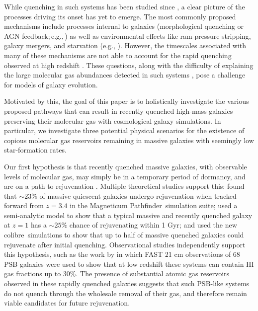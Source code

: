 \documentclass[twocolumn, linenumbers]{aastex631}
\newcommand{\magnet}[0]{{\sc Magneticum Pathfinder}}
\newcommand{\colibre}[0]{{\sc colibre}}
\begin{document}

While quenching in such systems has been studied since \citet{dressler}, a clear picture of the processes driving its onset has yet to emerge.  The most commonly proposed mechanisms include processes internal to galaxies (morphological quenching or AGN feedback;\,e.g.,\,\citealt{Martig09, Baron18, Calabro19}) as well as environmental effects like ram-pressure stripping, galaxy mergers, and starvation (e.g.,\! \citealt{blanton09,snyder, Lotz21, Spilker22, Donofrio25}).  However, the timescales associated with many of these mechanisms are not able to account for the rapid quenching observed at high redshift \citep{Yesuf14, french_2017, winds, french_2021, Bezanson_2022}. These questions, along with the difficulty of explaining the large molecular gas abundances detected in such systems \citep[e.g.,][]{YusefHo20, cenci25, setton2025}, pose a challenge for models of galaxy evolution.

Motivated by this, the goal of this paper is to holistically investigate the various proposed pathways that can result in recently quenched high-mass galaxies preserving their molecular gas with cosmological galaxy simulations.  In particular, we investigate three potential physical scenarios for the existence of copious molecular gas reservoirs remaining in massive galaxies with seemingly low star-formation rates.

Our first hypothesis is that recently quenched massive galaxies, with observable levels of molecular gas, may simply be in a temporary period of dormancy, and are on a path to rejuvenation \citep{remus2023,Kimmig25}.  Multiple theoretical studies support this: \cite{Lotz21} found that $\sim23\%$ of massive quiescent galaxies undergo rejuvenation when tracked forward from $z=3.4$ in the \magnet\ simulation suite; \cite{harrold2025} used a semi-analytic model to show that a typical massive and recently quenched galaxy at $z=1$ has a $\sim25\%$ chance of rejuvenating within 1 Gyr; and \cite{colibre} used the new \colibre\ simulations to show that up to half of massive quenched galaxies could rejuvenate after initial quenching.  Observational studies independently support this hypothesis, such as the work by \cite{ellison25} in which FAST 21 cm observations of 68 PSB galaxies were used to show that at low redshift these systems can contain HI gas fractions up to 30\%.  The presence of substantial atomic gas reservoirs observed in these rapidly quenched galaxies suggests that such PSB-like systems do not quench through the wholesale removal of their gas, and therefore remain viable candidates for future rejuvenation.
\end{document}

